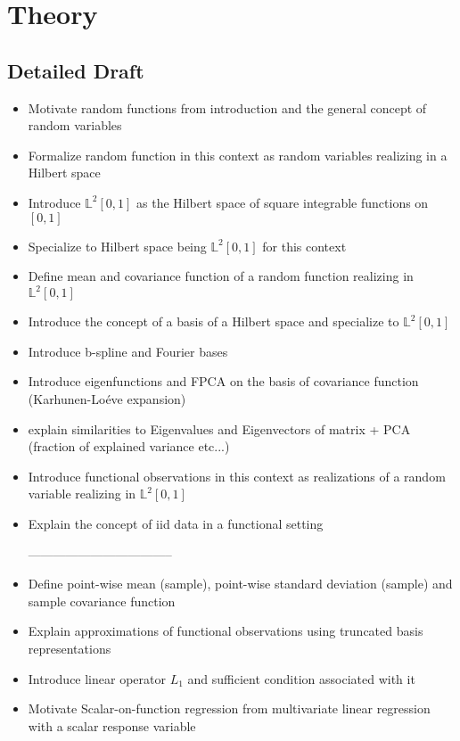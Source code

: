 \documentclass[11pt,twoside,a4paper]{article}
\begin{document}
	\section{Theory}
	
	\subsection{Detailed Draft}
	\begin{itemize}
		\item Motivate random functions from introduction and the general concept of random variables
		\item Formalize random function in this context as random variables realizing in a Hilbert space
		\item Introduce $\mathbb{L}^2[0,1]$ as the Hilbert space of square integrable functions on $[0,1]$
		\item Specialize to Hilbert space being $\mathbb{L}^2[0,1]$ for this context
		\item Define mean and covariance function of a random function realizing in $\mathbb{L}^2[0,1]$
		\item Introduce the concept of a basis of a Hilbert space and specialize to $\mathbb{L}^2[0,1]$
		\item Introduce b-spline and Fourier bases
		\item Introduce eigenfunctions and FPCA on the basis of covariance function (Karhunen-Lo\'{e}ve expansion)
		\item explain similarities to Eigenvalues and Eigenvectors of matrix + PCA (fraction of explained variance etc...)
		\item Introduce functional observations in this context as realizations of a random variable realizing in $\mathbb{L}^2[0,1]$
		\item Explain the concept of iid data in a functional setting
		
-----------------------------------		
		
		\item Define point-wise mean (sample), point-wise standard deviation (sample) and sample covariance function
		\item Explain approximations of functional observations using truncated basis representations
		\item Introduce linear operator $L_1$ and sufficient condition associated with it
		\item Motivate Scalar-on-function regression from multivariate linear regression with a scalar response variable
	\end{itemize}
\end{document}

